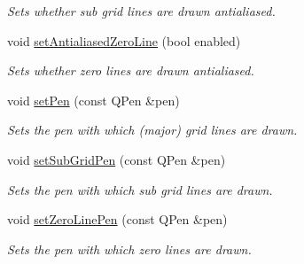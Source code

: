 \begin{DoxyCompactItemize}
\begin{DoxyCompactList}\small\item\em Sets whether sub grid lines are drawn antialiased. \end{DoxyCompactList}\item 
\hypertarget{classQCPGrid_a3cc6d54647393ee71afb6da56af07aa4}{}void \hyperlink{classQCPGrid_a3cc6d54647393ee71afb6da56af07aa4}{set\+Antialiased\+Zero\+Line} (bool enabled)\label{classQCPGrid_a3cc6d54647393ee71afb6da56af07aa4}

\begin{DoxyCompactList}\small\item\em Sets whether zero lines are drawn antialiased. \end{DoxyCompactList}\item 
\hypertarget{classQCPGrid_aa05ab9816ffb440908171e45e833b593}{}void \hyperlink{classQCPGrid_aa05ab9816ffb440908171e45e833b593}{set\+Pen} (const Q\+Pen \&pen)\label{classQCPGrid_aa05ab9816ffb440908171e45e833b593}

\begin{DoxyCompactList}\small\item\em Sets the pen with which (major) grid lines are drawn. \end{DoxyCompactList}\item 
\hypertarget{classQCPGrid_a9edd3593f384d1f0b0202a39cef4453d}{}void \hyperlink{classQCPGrid_a9edd3593f384d1f0b0202a39cef4453d}{set\+Sub\+Grid\+Pen} (const Q\+Pen \&pen)\label{classQCPGrid_a9edd3593f384d1f0b0202a39cef4453d}

\begin{DoxyCompactList}\small\item\em Sets the pen with which sub grid lines are drawn. \end{DoxyCompactList}\item 
void \hyperlink{classQCPGrid_a209f40fdb252397b418b82d3494d8ea0}{set\+Zero\+Line\+Pen} (const Q\+Pen \&pen)
\begin{DoxyCompactList}\small\item\em Sets the pen with which zero lines are drawn. \end{DoxyCompactList}\end{DoxyCompactItemize}
